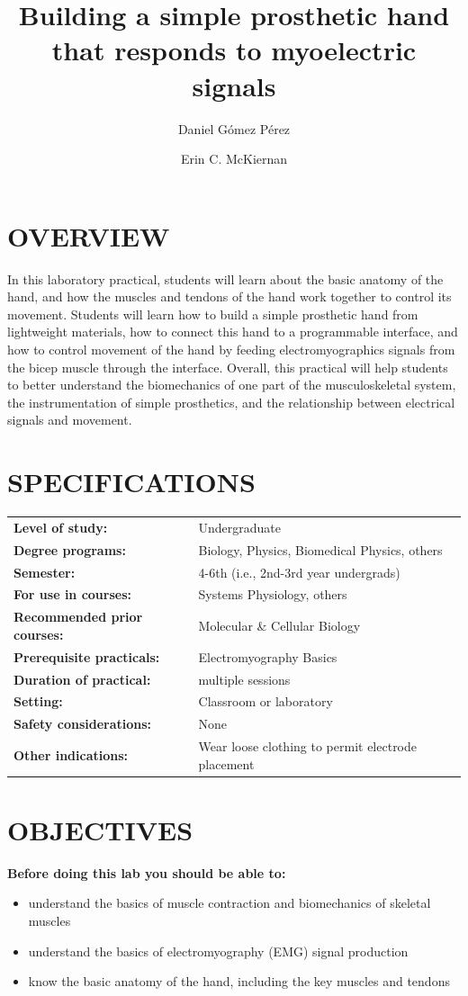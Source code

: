 \documentclass[12pt]{article}
\title{\vspace{-1.8cm}\Large{\textbf{Building a simple prosthetic hand that responds to myoelectric signals}}}
\author[1]{Daniel G\'omez P\'erez}
\author[2]{Erin C. McKiernan}
\affil[1]{\small{Licenciatura en F\'isica Biom\'edica, Facultad de Ciencias, Universidad Nacional Aut\'onoma de M\'exico}}
\affil[2]{\small{Departamento de F\'isica, Facultad de Ciencias, Universidad Nacional Aut\'onoma de M\'exico}}
\date{}
\begin{document}
\maketitle


\section*{OVERVIEW}
In this laboratory practical, students will learn about the basic anatomy of the hand, and how the muscles and tendons of the hand work together to control its movement. Students will learn how to build a simple prosthetic hand from lightweight materials, how to connect this hand to a programmable interface, and how to control movement of the hand by feeding electromyographics signals from the bicep muscle through the interface. Overall, this practical will help students to better understand the biomechanics of one part of the musculoskeletal system, the instrumentation of simple prosthetics, and the relationship between electrical signals and movement. 

\section*{SPECIFICATIONS}
\begin{tabular}{p{6cm} p{10cm}}
\textbf{Level of study:} & Undergraduate \\
\textbf{Degree programs:} & Biology, Physics, Biomedical Physics, others \\
\textbf{Semester:} & 4-6th (i.e., 2nd-3rd year undergrads) \\ 
\textbf{For use in courses:} & Systems Physiology, others \\
\textbf{Recommended prior courses:} & Molecular \& Cellular Biology \\
\textbf{Prerequisite practicals:} & Electromyography Basics \\
\textbf{Duration of practical:} & multiple sessions \\
\textbf{Setting:} & Classroom or laboratory \\
\textbf{Safety considerations:} & None \\
\textbf{Other indications:} & Wear loose clothing to permit electrode placement
\end{tabular}

\section*{OBJECTIVES}
\textbf{Before doing this lab you should be able to:}
\begin{itemize}
\item understand the basics of muscle contraction and biomechanics of skeletal muscles
\item understand the basics of electromyography (EMG) signal production 
\item know the basic anatomy of the hand, including the key muscles and tendons 
\end{itemize}
 
\end{document}
